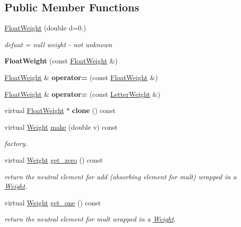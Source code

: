 \subsection*{Public Member Functions}
\begin{DoxyCompactItemize}
\item 
\mbox{\hyperlink{group__weight_ga7eed0253fd20af20e3fec8dc2f4652b8}{Float\+Weight}} (double d=0.)
\begin{DoxyCompactList}\small\item\em defaut = null weight -\/ not unknown \end{DoxyCompactList}\item 
{\bfseries Float\+Weight} (const \mbox{\hyperlink{classFloatWeight}{Float\+Weight}} \&)
\item 
\mbox{\hyperlink{classFloatWeight}{Float\+Weight}} \& {\bfseries operator=} (const \mbox{\hyperlink{classFloatWeight}{Float\+Weight}} \&)
\item 
\mbox{\hyperlink{classFloatWeight}{Float\+Weight}} \& {\bfseries operator=} (const \mbox{\hyperlink{classLetterWeight}{Letter\+Weight}} \&)
\item 
virtual \mbox{\hyperlink{classFloatWeight}{Float\+Weight}} $\ast$ {\bfseries clone} () const
\item 
virtual \mbox{\hyperlink{classWeight}{Weight}} \mbox{\hyperlink{classFloatWeight_a71464c94830161af2f0dd3df99fe6856}{make}} (double v) const
\begin{DoxyCompactList}\small\item\em factory. \end{DoxyCompactList}\item 
\mbox{\label{classFloatWeight_a0e9f541164db5cf13978efd46585810b}} 
virtual \mbox{\hyperlink{classWeight}{Weight}} \mbox{\hyperlink{classFloatWeight_a0e9f541164db5cf13978efd46585810b}{get\+\_\+zero}} () const
\begin{DoxyCompactList}\small\item\em return the neutral element for add (absorbing element for mult) wrapped in a \mbox{\hyperlink{classWeight}{Weight}}. \end{DoxyCompactList}\item 
\mbox{\label{classFloatWeight_a4952f3b312622eccc331b4d001c816a4}} 
virtual \mbox{\hyperlink{classWeight}{Weight}} \mbox{\hyperlink{classFloatWeight_a4952f3b312622eccc331b4d001c816a4}{get\+\_\+one}} () const
\begin{DoxyCompactList}\small\item\em return the neutral element for mult wrapped in a \mbox{\hyperlink{classWeight}{Weight}}. \end{DoxyCompactList}\item 

\end{DoxyCompactItemize}
